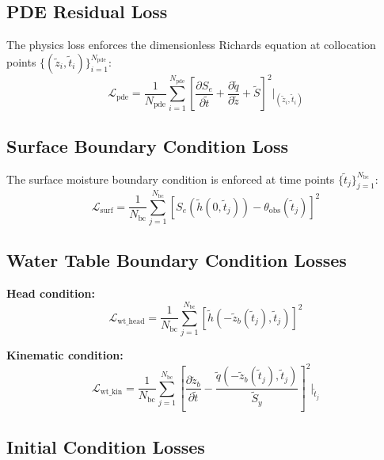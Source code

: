 \documentclass[11pt,a4paper]{article}
\begin{document}
\subsection{PDE Residual Loss}

The physics loss enforces the dimensionless Richards equation at collocation points $\{(\tilde{z}_i, \tilde{t}_i)\}_{i=1}^{N_{\text{pde}}}$:
\begin{equation}
    \mathcal{L}_{\text{pde}} = \frac{1}{N_{\text{pde}}} \sum_{i=1}^{N_{\text{pde}}} \left[\frac{\partial S_e}{\partial \tilde{t}} + \frac{\partial \tilde{q}}{\partial \tilde{z}} + \tilde{S}\right]^2\bigg|_{(\tilde{z}_i, \tilde{t}_i)}
\end{equation}

\subsection{Surface Boundary Condition Loss}

The surface moisture boundary condition is enforced at time points $\{\tilde{t}_j\}_{j=1}^{N_{\text{bc}}}$:
\begin{equation}
    \mathcal{L}_{\text{surf}} = \frac{1}{N_{\text{bc}}} \sum_{j=1}^{N_{\text{bc}}} \left[S_e(\tilde{h}(0, \tilde{t}_j)) - \theta_{\text{obs}}(\tilde{t}_j)\right]^2
\end{equation}

\subsection{Water Table Boundary Condition Losses}

\textbf{Head condition:}
\begin{equation}
    \mathcal{L}_{\text{wt\_head}} = \frac{1}{N_{\text{bc}}} \sum_{j=1}^{N_{\text{bc}}} \left[\tilde{h}(-\tilde{z}_b(\tilde{t}_j), \tilde{t}_j)\right]^2
\end{equation}

\textbf{Kinematic condition:}
\begin{equation}
    \mathcal{L}_{\text{wt\_kin}} = \frac{1}{N_{\text{bc}}} \sum_{j=1}^{N_{\text{bc}}} \left[\frac{\partial \tilde{z}_b}{\partial \tilde{t}} - \frac{\tilde{q}(-\tilde{z}_b(\tilde{t}_j), \tilde{t}_j)}{\tilde{S}_y}\right]^2\bigg|_{\tilde{t}_j}
\end{equation}

\subsection{Initial Condition Losses}
\end{document}
